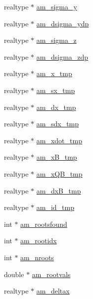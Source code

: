 \begin{DoxyCompactItemize}
\item 
realtype $\ast$ \hyperlink{struct_temp_data_ac152c0012fafda7a5ec5f2163eebfcda}{am\+\_\+sigma\+\_\+y}
\item 
realtype $\ast$ \hyperlink{struct_temp_data_a27781d18ccc799ac0074d2dc39d51abc}{am\+\_\+dsigma\+\_\+ydp}
\item 
realtype $\ast$ \hyperlink{struct_temp_data_a6326bdfdde6ff9d3e52a80760e403a02}{am\+\_\+sigma\+\_\+z}
\item 
realtype $\ast$ \hyperlink{struct_temp_data_ad918e459ea613f39e2d2a2fe62b68137}{am\+\_\+dsigma\+\_\+zdp}
\item 
realtype $\ast$ \hyperlink{struct_temp_data_a7751aebb2b290fc4a51d9ca5f47fb455}{am\+\_\+x\+\_\+tmp}
\item 
realtype $\ast$ \hyperlink{struct_temp_data_a4b0bde10a390f324386b07acacd367bc}{am\+\_\+sx\+\_\+tmp}
\item 
realtype $\ast$ \hyperlink{struct_temp_data_abd683baa60bb69c9731961ba50e1455d}{am\+\_\+dx\+\_\+tmp}
\item 
realtype $\ast$ \hyperlink{struct_temp_data_ac0bc306224fbe129accbc959efda5451}{am\+\_\+sdx\+\_\+tmp}
\item 
realtype $\ast$ \hyperlink{struct_temp_data_ac28b5a5a19ad2004d32d20098d3603ed}{am\+\_\+xdot\+\_\+tmp}
\item 
realtype $\ast$ \hyperlink{struct_temp_data_a71147dc6b9970cafbada503f873d0dfe}{am\+\_\+x\+B\+\_\+tmp}
\item 
realtype $\ast$ \hyperlink{struct_temp_data_a18e2184588648670c2df22856f441e32}{am\+\_\+x\+Q\+B\+\_\+tmp}
\item 
realtype $\ast$ \hyperlink{struct_temp_data_a147fbb5ac85bc9ce0f55cb9108663e1b}{am\+\_\+dx\+B\+\_\+tmp}
\item 
realtype $\ast$ \hyperlink{struct_temp_data_af4cb4bb8ec3396d46cca992ad83ae137}{am\+\_\+id\+\_\+tmp}
\item 
int $\ast$ \hyperlink{struct_temp_data_a7aead84117fd84087a23d968ea56b542}{am\+\_\+rootsfound}
\item 
int $\ast$ \hyperlink{struct_temp_data_a360ea220e712750c92bd3fc8b56230e2}{am\+\_\+rootidx}
\item 
int $\ast$ \hyperlink{struct_temp_data_af329293bdb28f52dcaeb04355dc5c69e}{am\+\_\+nroots}
\item 
double $\ast$ \hyperlink{struct_temp_data_a9cf09c47af8f82be3bba711720009efe}{am\+\_\+rootvals}
\item 
realtype $\ast$ \hyperlink{struct_temp_data_ab432281618cfe0f7dd7db1d8eb5ec227}{am\+\_\+deltax}

\end{DoxyCompactItemize}
